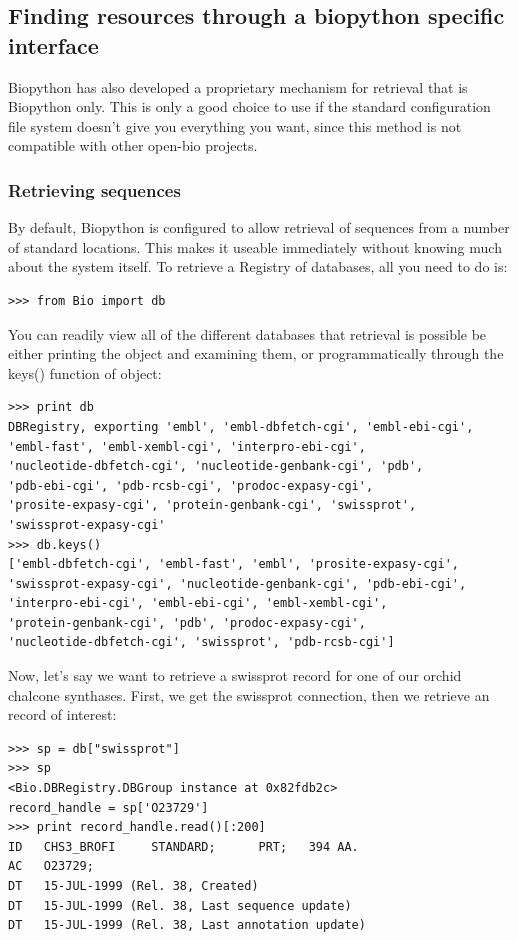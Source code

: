 \documentclass{report}
\begin{document}
\subsection{Finding resources through a biopython specific interface}

Biopython has also developed a proprietary mechanism for retrieval that
is Biopython only. This is only a good choice to use if the standard
configuration file system doesn't give you everything you want, since
this method is not compatible with other open-bio projects.

\subsubsection{Retrieving sequences}

By default, Biopython is configured to allow retrieval of sequences from
a number of standard locations. This makes it useable immediately
without knowing much about the system itself. To retrieve a Registry of
databases, all you need to do is:

\begin{verbatim}
>>> from Bio import db
\end{verbatim}

You can readily view all of the different databases that retrieval is
possible be either printing the object and examining them, or
programmatically through the keys() function of object:

\begin{verbatim}
>>> print db
DBRegistry, exporting 'embl', 'embl-dbfetch-cgi', 'embl-ebi-cgi',
'embl-fast', 'embl-xembl-cgi', 'interpro-ebi-cgi',
'nucleotide-dbfetch-cgi', 'nucleotide-genbank-cgi', 'pdb',
'pdb-ebi-cgi', 'pdb-rcsb-cgi', 'prodoc-expasy-cgi',
'prosite-expasy-cgi', 'protein-genbank-cgi', 'swissprot',
'swissprot-expasy-cgi'
>>> db.keys()
['embl-dbfetch-cgi', 'embl-fast', 'embl', 'prosite-expasy-cgi',
'swissprot-expasy-cgi', 'nucleotide-genbank-cgi', 'pdb-ebi-cgi',
'interpro-ebi-cgi', 'embl-ebi-cgi', 'embl-xembl-cgi',
'protein-genbank-cgi', 'pdb', 'prodoc-expasy-cgi',
'nucleotide-dbfetch-cgi', 'swissprot', 'pdb-rcsb-cgi']
\end{verbatim}

Now, let's say we want to retrieve a swissprot record for one of our
orchid chalcone synthases. First, we get the swissprot connection, then
we retrieve an record of interest:

\begin{verbatim}
>>> sp = db["swissprot"]
>>> sp
<Bio.DBRegistry.DBGroup instance at 0x82fdb2c>
record_handle = sp['O23729']
>>> print record_handle.read()[:200]
ID   CHS3_BROFI     STANDARD;      PRT;   394 AA.
AC   O23729;
DT   15-JUL-1999 (Rel. 38, Created)
DT   15-JUL-1999 (Rel. 38, Last sequence update)
DT   15-JUL-1999 (Rel. 38, Last annotation update)
\end{verbatim}
\end{document}
